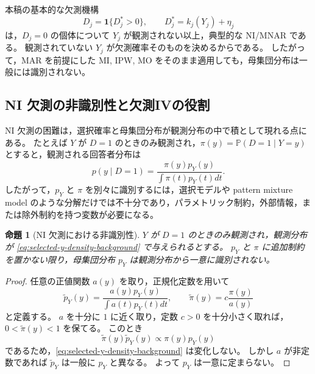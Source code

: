 \documentclass[dvipdfmx,autodetect-engine]{jsarticle}
\newtheorem{proposition}{命題}
\newcommand{\Prb}{\mathbb{P}}
\newcommand{\1}{\mathbf{1}}
\begin{document}
本稿の基本的な欠測機構
\begin{equation}
  D_j=\1\{D_j^*>0\},
  \qquad
  D_j^*=k_j(Y_j)+\eta_j
  \label{eq:background-y-dependent-missing}
\end{equation}
は，$D_j=0$ の個体について $Y_j$ が観測されない以上，典型的な NI/MNAR である。
観測されていない $Y_j$ が欠測確率そのものを決めるからである。
したがって，MAR を前提にした MI, IPW, MO をそのまま適用しても，母集団分布は一般には識別されない。

\subsection{NI 欠測の非識別性と欠測IVの役割}

NI 欠測の困難は，選択確率と母集団分布が観測分布の中で積として現れる点にある。
たとえば $Y$ が $D=1$ のときのみ観測され，$\pi(y)=\Prb(D=1\mid Y=y)$ とすると，観測される回答者分布は
\begin{equation}
  p(y\mid D=1)
  =
  \frac{\pi(y)p_Y(y)}{\int \pi(t)p_Y(t)dt}.
  \label{eq:selected-y-density-background}
\end{equation}
したがって，$p_Y$ と $\pi$ を別々に識別するには，選択モデルや pattern mixture model のような分解だけでは不十分であり，パラメトリック制約，外部情報，または除外制約を持つ変数が必要になる。

\begin{proposition}[NI 欠測における非識別性]
\label{prop:background-ni-nonid}
$Y$ が $D=1$ のときのみ観測され，観測分布が \eqref{eq:selected-y-density-background} で与えられるとする。
$p_Y$ と $\pi$ に追加制約を置かない限り，母集団分布 $p_Y$ は観測分布から一意に識別されない。
\end{proposition}

\begin{proof}
任意の正値関数 $a(y)$ を取り，正規化定数を用いて
\begin{equation}
  \widetilde p_Y(y)=\frac{a(y)p_Y(y)}{\int a(t)p_Y(t)dt},
  \qquad
  \widetilde \pi(y)=c\frac{\pi(y)}{a(y)}
  \label{eq:background-tilting}
\end{equation}
と定義する。
$a$ を十分に $1$ に近く取り，定数 $c>0$ を十分小さく取れば，$0<\widetilde \pi(y)<1$ を保てる。
このとき
\begin{equation}
  \widetilde \pi(y)\widetilde p_Y(y)
  \propto
  \pi(y)p_Y(y)
\end{equation}
であるため，\eqref{eq:selected-y-density-background} は変化しない。
しかし $a$ が非定数であれば $\widetilde p_Y$ は一般に $p_Y$ と異なる。
よって $p_Y$ は一意に定まらない。
\end{proof}
\end{document}
